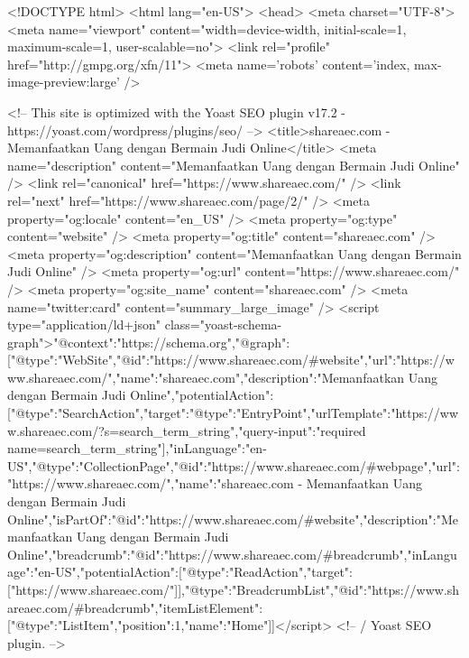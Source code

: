 <!DOCTYPE html>
<html lang="en-US">
<head>
	<meta charset="UTF-8">
	<meta name="viewport" content="width=device-width, initial-scale=1, maximum-scale=1, user-scalable=no">
	<link rel="profile" href="http://gmpg.org/xfn/11">
	<meta name='robots' content='index, max-image-preview:large' />

	<!-- This site is optimized with the Yoast SEO plugin v17.2 - https://yoast.com/wordpress/plugins/seo/ -->
	<title>shareaec.com - Memanfaatkan Uang dengan Bermain Judi Online</title>
	<meta name="description" content="Memanfaatkan Uang dengan Bermain Judi Online" />
	<link rel="canonical" href="https://www.shareaec.com/" />
	<link rel="next" href="https://www.shareaec.com/page/2/" />
	<meta property="og:locale" content="en_US" />
	<meta property="og:type" content="website" />
	<meta property="og:title" content="shareaec.com" />
	<meta property="og:description" content="Memanfaatkan Uang dengan Bermain Judi Online" />
	<meta property="og:url" content="https://www.shareaec.com/" />
	<meta property="og:site_name" content="shareaec.com" />
	<meta name="twitter:card" content="summary_large_image" />
	<script type="application/ld+json" class="yoast-schema-graph">{"@context":"https://schema.org","@graph":[{"@type":"WebSite","@id":"https://www.shareaec.com/#website","url":"https://www.shareaec.com/","name":"shareaec.com","description":"Memanfaatkan Uang dengan Bermain Judi Online","potentialAction":[{"@type":"SearchAction","target":{"@type":"EntryPoint","urlTemplate":"https://www.shareaec.com/?s={search_term_string}"},"query-input":"required name=search_term_string"}],"inLanguage":"en-US"},{"@type":"CollectionPage","@id":"https://www.shareaec.com/#webpage","url":"https://www.shareaec.com/","name":"shareaec.com - Memanfaatkan Uang dengan Bermain Judi Online","isPartOf":{"@id":"https://www.shareaec.com/#website"},"description":"Memanfaatkan Uang dengan Bermain Judi Online","breadcrumb":{"@id":"https://www.shareaec.com/#breadcrumb"},"inLanguage":"en-US","potentialAction":[{"@type":"ReadAction","target":["https://www.shareaec.com/"]}]},{"@type":"BreadcrumbList","@id":"https://www.shareaec.com/#breadcrumb","itemListElement":[{"@type":"ListItem","position":1,"name":"Home"}]}]}</script>
	<!-- / Yoast SEO plugin. -->


